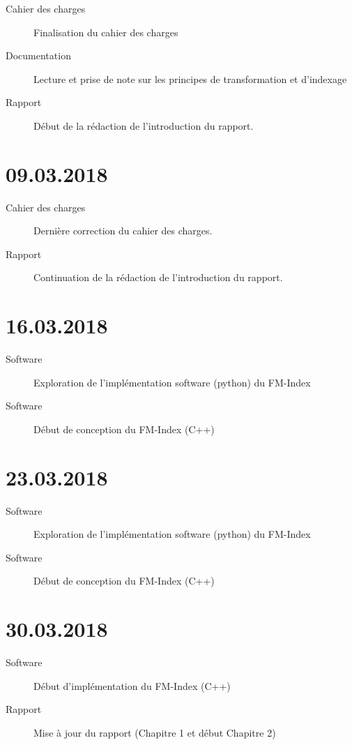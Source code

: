 \begin{description}
	\item [Cahier des charges] Finalisation du cahier des charges
	\item [Documentation] Lecture et prise de note sur les principes de transformation et d'indexage
	\item [Rapport] Début de la rédaction de l'introduction du rapport.
	
\end{description}

\section*{09.03.2018}

\begin{description}
	\item [Cahier des charges] Dernière correction du cahier des charges.
	\item [Rapport] Continuation de la rédaction de l'introduction du rapport.
\end{description}

\section*{16.03.2018}

\begin{description}
	\item [Software] Exploration de l'implémentation software (python) du FM-Index
	\item [Software] Début de conception du FM-Index (C++)
\end{description}


\section*{23.03.2018}

\begin{description}
	\item [Software] Exploration de l'implémentation software (python) du FM-Index
	\item [Software] Début de conception du FM-Index (C++)
\end{description}

\section*{30.03.2018}

\begin{description}
	\item [Software] Début d'implémentation du FM-Index (C++)
	\item [Rapport] Mise à jour du rapport (Chapitre 1 et début Chapitre 2)
\end{description}

